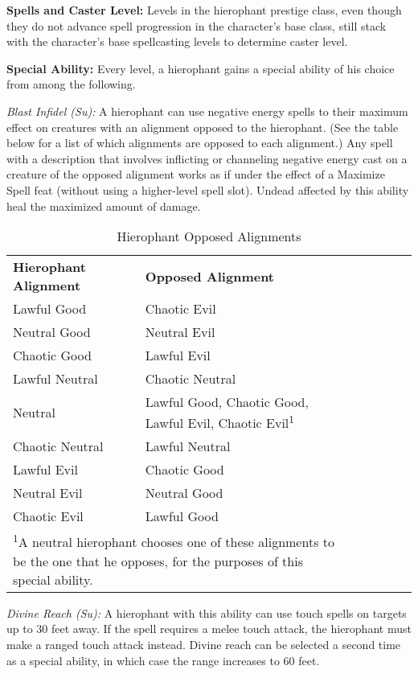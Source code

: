 \textbf{Spells and Caster Level:} Levels in the hierophant prestige class, even 
though they do not advance spell progression in the character's base class, still 
stack with the character's base spellcasting levels to determine caster level.

\textbf{Special Ability:} Every level, a hierophant gains a special ability of 
his choice from among the following.

\textit{Blast Infidel (Su):} A hierophant can use negative energy spells to their 
maximum effect on creatures with an alignment opposed to the hierophant. (See the 
table below for a list of which alignments are opposed to each alignment.) Any 
spell with a description that involves inflicting or channeling negative energy 
cast on a creature of the opposed alignment works as if under the effect of a Maximize 
Spell feat (without using a higher-level spell slot). Undead affected by this ability 
heal the maximized amount of damage.

\begin{table}[htb]
\mcinherit
\caption{Hierophant Opposed Alignments}
\centering
\begin{tabular}{*{6}{l}c}
\textbf{Hierophant Alignment} & \textbf{Opposed Alignment}\\
Lawful Good & Chaotic Evil\\
Neutral Good & Neutral Evil\\
Chaotic Good & Lawful Evil\\
Lawful Neutral & Chaotic Neutral\\
Neutral & Lawful Good, Chaotic Good, Lawful Evil, Chaotic Evil\textsuperscript{1}\\
Chaotic Neutral & Lawful Neutral\\
Lawful Evil & Chaotic Good\\
Neutral Evil & Neutral Good\\
Chaotic Evil & Lawful Good\\
\multicolumn{2}{p{10cm}}{\textsuperscript{1}A neutral hierophant chooses one of these alignments to be the one that he opposes, for the purposes of this special ability.}\\
\end{tabular}
\end{table}

\textit{Divine Reach (Su):} A hierophant with this ability can use touch spells 
on targets up to 30 feet away. If the spell requires a melee touch attack, the 
hierophant must make a ranged touch attack instead. Divine reach can be selected 
a second time as a special ability, in which case the range increases to 60 feet.

